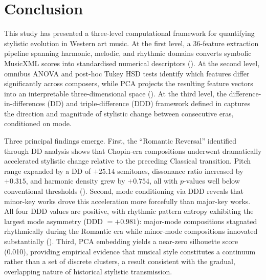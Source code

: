 \documentclass[]{interact}
\theoremstyle{plain}
\theoremstyle{definition}
\theoremstyle{remark}
\begin{document}
\section{Conclusion}\label{sec:conclusion}

This study has presented a three-level computational framework for
quantifying stylistic evolution in Western art music. At the first level,
a 36-feature extraction pipeline spanning harmonic, melodic, and rhythmic
domains converts symbolic MusicXML scores into standardised numerical
descriptors (). At the second level, omnibus ANOVA and
post-hoc Tukey HSD tests identify which features differ significantly
across composers, while PCA projects the resulting feature vectors into
an interpretable three-dimensional space (). At the
third level, the difference-in-differences (DD) and triple-difference (DDD)
framework defined in  captures the direction and
magnitude of stylistic change between consecutive eras, conditioned on
mode.

Three principal findings emerge. First, the ``Romantic Reversal'' identified
through DD analysis shows that Chopin-era compositions underwent
dramatically accelerated stylistic change relative to the preceding
Classical transition. Pitch range expanded by a DD of $+25.14$ semitones,
dissonance ratio increased by $+0.315$, and harmonic density grew by
$+0.754$, all with $p$-values well below conventional thresholds
(). Second, mode conditioning via DDD reveals that
minor-key works drove this acceleration more forcefully than major-key
works. All four DDD values are positive, with rhythmic pattern entropy
exhibiting the largest mode asymmetry (DDD $= +0.981$): major-mode
compositions stagnated rhythmically during the Romantic era while
minor-mode compositions innovated substantially (). Third,
PCA embedding yields a near-zero silhouette score (0.010), providing
empirical evidence that musical style constitutes a continuum rather
than a set of discrete clusters, a result consistent with the gradual,
overlapping nature of historical stylistic transmission.
\end{document}
